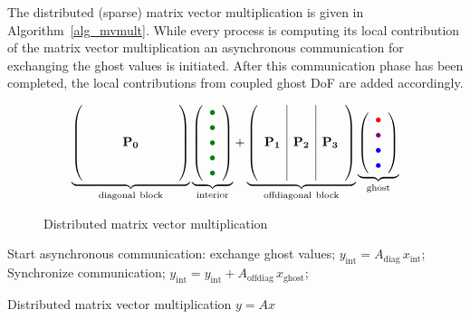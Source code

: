 \documentclass[a4paper, 11pt, twoside]{article}
\begin{document}
The distributed (sparse) matrix vector multiplication is given in
Algorithm~\ref{alg_mvmult}. While every process is computing its local
contribution of the matrix vector multiplication an asynchronous communication
for exchanging the ghost values is initiated. After this communication
phase has been completed, the local contributions from coupled ghost DoF are
added accordingly.
%
\begin{figure}[!ht]
  $$
  \underbrace{
  \left(
  \begin{array}{ccccc}
    ~ & ~ & ~ & ~ & ~ \\
    ~ & ~ & ~ & ~ & ~ \\
    ~ & ~ & \mathbf{P_0} & ~ & ~\\
    ~ & ~ & ~ & ~ & ~ \\
    ~ & ~ & ~ & ~ & ~
  \end{array}
  \right)
  }_{\mathrm{diagonal~block}}
  \underbrace{
  \left(
  \begin{array}{c}
    {\color{green!50!black} \bullet} \\
    {\color{green!50!black} \bullet} \\
    {\color{green!50!black} \bullet} \\
    {\color{green!50!black} \bullet} \\
    {\color{green!50!black} \bullet}
  \end{array}
  \right)
  }_{\mathrm{interior}}
  +
  \underbrace{
  \left(
  \begin{array}{c|c|c}
    ~ & ~ & ~ \\
    ~ & ~ & ~ \\
    \mathbf{P_1} & \mathbf{P_2} & \mathbf{P_3} \\
    ~ & ~ & ~ \\
    ~ & ~ & ~
  \end{array}
  \right)
  }_{\mathrm{offdiagonal~block}}
  \underbrace{
  \left(
  \begin{array}{c}
    {\color{red} \bullet} \\
    {\color{violet} \bullet} \\
    {\color{blue} \bullet} \\
    {\color{blue} \bullet}  \end{array}
  \right)
  }_{\mathrm{ghost}}
  $$
\caption{Distributed matrix vector multiplication}
\label{fig:mvmult}
\end{figure}
%
\begin{algorithm}[tb]
%
\begin{algorithmic}
    \State Start asynchronous communication: exchange ghost values;
    \State $y_{\mathrm{int}} = A_{\mathrm{diag}} \, x_{\mathrm{int}}$;
    \State Synchronize communication;
    \State $y_{\mathrm{int}} =  y_{\mathrm{int}} + A_{\mathrm{offdiag}} \,
x_{\mathrm{ghost}}$;
  \EndFunction
\end{algorithmic}
\caption{Distributed matrix vector multiplication $y = Ax$}
\label{alg_mvmult}
\end{algorithm}
\end{document}
